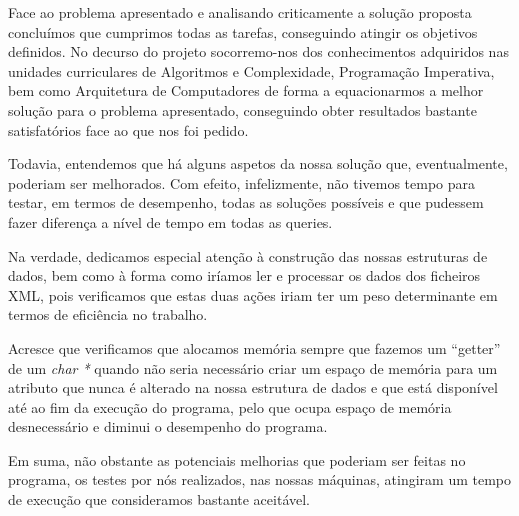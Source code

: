\documentclass[a4paper]{article}
\begin{document}
Face ao problema apresentado e analisando criticamente a solução proposta concluímos
que cumprimos todas as tarefas, conseguindo atingir os objetivos definidos. No decurso
do projeto socorremo-nos dos conhecimentos adquiridos nas unidades curriculares de
Algoritmos e Complexidade, Programação Imperativa, bem como Arquitetura de Computadores
de forma a equacionarmos a melhor solução para o problema apresentado, conseguindo
obter resultados bastante satisfatórios face ao que nos foi pedido. \par
Todavia, entendemos que há alguns aspetos da nossa solução que, eventualmente,
poderiam ser melhorados. Com efeito, infelizmente, não tivemos tempo para testar,
em termos de desempenho, todas as soluções possíveis e que pudessem fazer diferença
a nível de tempo em todas as queries.\par
Na verdade, dedicamos especial atenção à construção das nossas estruturas de dados,
bem como à forma como iríamos ler e processar os dados dos ficheiros XML, pois
verificamos que estas duas ações iriam ter um peso determinante em termos de
eficiência no trabalho. \par
Acresce que verificamos que alocamos memória sempre que fazemos um ``getter'' de um
\textit{char *} quando não seria necessário criar um espaço de memória para um
atributo que nunca é alterado na nossa estrutura de dados e que está disponível
até ao fim da execução do programa, pelo que ocupa espaço de memória desnecessário
e diminui o desempenho do programa. \par
Em suma, não obstante as potenciais melhorias que poderiam ser feitas no
programa, os testes por nós realizados, nas nossas máquinas, atingiram
um tempo de execução que consideramos bastante aceitável.
\end{document}
